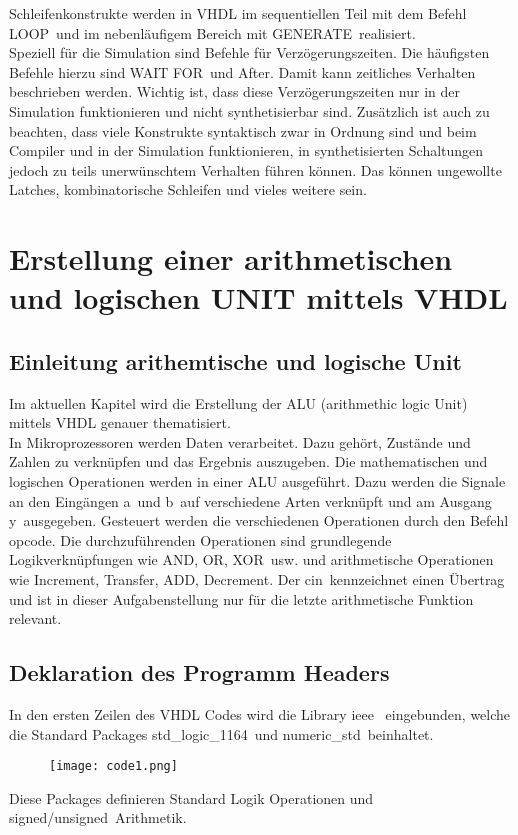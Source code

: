 \documentclass[12pt,a4paper]{scrartcl}	%
\begin{document}
Schleifenkonstrukte werden in VHDL im sequentiellen Teil mit dem Befehl \glqq LOOP\grqq~und im nebenläufigem Bereich mit \glqq GENERATE\grqq~realisiert.\\
Speziell für die Simulation sind Befehle für Verzögerungszeiten. Die häufigsten Befehle hierzu sind \glqq WAIT FOR\grqq~und \glqq After\grqq. Damit kann zeitliches Verhalten beschrieben werden. Wichtig ist, dass diese Verzögerungszeiten nur in der Simulation funktionieren und nicht synthetisierbar sind. Zusätzlich ist auch zu beachten, dass viele Konstrukte syntaktisch zwar in Ordnung sind und beim Compiler und in der Simulation funktionieren, in synthetisierten Schaltungen jedoch zu teils unerwünschtem Verhalten führen können. Das können ungewollte Latches, kombinatorische Schleifen und vieles weitere sein.
\section{Erstellung einer arithmetischen und logischen UNIT mittels VHDL}
\subsection{Einleitung arithemtische und logische Unit }
Im aktuellen Kapitel wird die Erstellung der ALU (arithmethic logic Unit) mittels VHDL genauer thematisiert.\\
In Mikroprozessoren werden Daten verarbeitet. Dazu gehört, Zustände und Zahlen zu verknüpfen und das Ergebnis auszugeben. Die mathematischen und logischen Operationen werden in einer ALU ausgeführt. Dazu werden die Signale an den Eingängen \glqq a\grqq~und \glqq b\grqq~auf verschiedene Arten verknüpft und am Ausgang \glqq y\grqq~ausgegeben. Gesteuert werden die verschiedenen Operationen durch den Befehl \glqq opcode\grqq. Die durchzuführenden Operationen sind grundlegende Logikverknüpfungen wie \glqq AND, OR, XOR\grqq~usw. und arithmetische Operationen wie \glqq Increment, Transfer, ADD, Decrement\grqq. Der \glqq cin\grqq~kennzeichnet einen Übertrag und ist in dieser Aufgabenstellung nur für die letzte arithmetische Funktion relevant.\\
\subsection{Deklaration des Programm Headers}
In den ersten Zeilen des VHDL Codes wird die \glqq Library ieee \grqq~eingebunden, welche die Standard Packages \glqq std\_logic\_1164\grqq~und \glqq numeric\_std\grqq~beinhaltet. 
\begin{figure}[h]
	
	\texttt{[image: code1.png]}
\end{figure}
Diese Packages definieren Standard Logik Operationen und \glqq signed/unsigned\grqq~Arithmetik.\\
\end{document}
